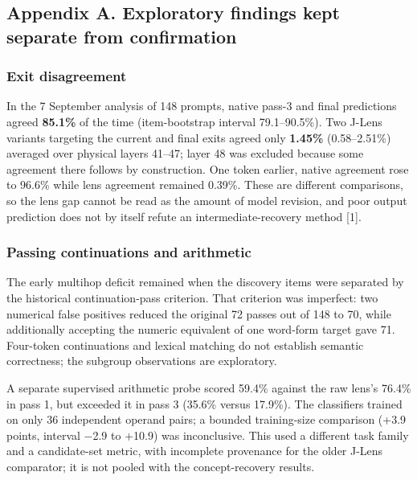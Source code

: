 \documentclass[
  british,
  11pt,
  a4paper,
]{article}
\begin{document}
\newpage

\subsection{Appendix A. Exploratory findings kept separate from
confirmation}\label{appendix-a.-exploratory-findings-kept-separate-from-confirmation}

\subsubsection{Exit disagreement}\label{exit-disagreement}

In the 7 September analysis of 148 prompts, native pass-3 and final
predictions agreed \textbf{85.1\%} of the time (item-bootstrap interval
79.1--90.5\%). Two J-Lens variants targeting the current and final exits
agreed only \textbf{1.45\%} (0.58--2.51\%) averaged over physical layers
41--47; layer 48 was excluded because some agreement there follows by
construction. One token earlier, native agreement rose to 96.6\% while
lens agreement remained 0.39\%. These are different comparisons, so the
lens gap cannot be read as the amount of model revision, and poor output
prediction does not by itself refute an intermediate-recovery method
{[}1{]}.

\subsubsection{Passing continuations and
arithmetic}\label{passing-continuations-and-arithmetic}

The early multihop deficit remained when the discovery items were
separated by the historical continuation-pass criterion. That criterion
was imperfect: two numerical false positives reduced the original 72
passes out of 148 to 70, while additionally accepting the numeric
equivalent of one word-form target gave 71. Four-token continuations and
lexical matching do not establish semantic correctness; the subgroup
observations are exploratory.

A separate supervised arithmetic probe scored 59.4\% against the raw
lens's 76.4\% in pass 1, but exceeded it in pass 3 (35.6\% versus
17.9\%). The classifiers trained on only 36 independent operand pairs; a
bounded training-size comparison (+3.9 points, interval −2.9 to +10.9)
was inconclusive. This used a different task family and a candidate-set
metric, with incomplete provenance for the older J-Lens comparator; it
is not pooled with the concept-recovery results.
\end{document}
